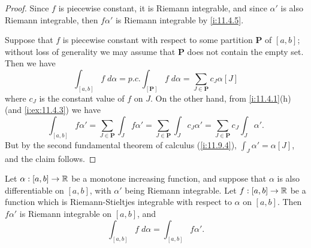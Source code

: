 \begin{proof}
  Since \(f\) is piecewise constant, it is Riemann integrable, and since \(\alpha'\) is also Riemann integrable, then \(f \alpha'\) is Riemann integrable by \cref{i:11.4.5}.

  Suppose that \(f\) is piecewise constant with respect to some partition \(\mathbf{P}\) of \([a, b]\);
  without loss of generality we may assume that \(\mathbf{P}\) does not contain the empty set.
  Then we have
  \[
    \int_{[a, b]} f \; d \alpha = p.c. \int_{[\mathbf{P}]} f \; d \alpha = \sum_{J \in \mathbf{P}} c_J \alpha[J]
  \]
  where \(c_J\) is the constant value of \(f\) on \(J\).
  On the other hand, from \cref{i:11.4.1}(h) (and \cref{i:ex:11.4.3}) we have
  \[
    \int_{[a, b]} f \alpha' = \sum_{J \in \mathbf{P}} \int_J f \alpha' = \sum_{J \in \mathbf{P}} \int_J c_J \alpha' = \sum_{J \in \mathbf{P}} c_J \int_J \alpha'.
  \]
  But by the second fundamental theorem of calculus (\cref{i:11.9.4}), \(\int_J \alpha' = \alpha[J]\), and the claim follows.
\end{proof}

\begin{cor}\label{i:11.10.3}
  Let \(\alpha : [a, b] \to \mathbb{R}\) be a monotone increasing function, and suppose that \(\alpha\) is also differentiable on \([a, b]\), with \(\alpha'\) being Riemann integrable.
  Let \(f : [a, b] \to \mathbb{R}\) be a function which is Riemann-Stieltjes integrable with respect to \(\alpha\) on \([a, b]\).
  Then \(f \alpha'\) is Riemann integrable on \([a, b]\), and
  \[
    \int_{[a, b]} f \; d \alpha = \int_{[a, b]} f \alpha'.
  \]
\end{cor}

